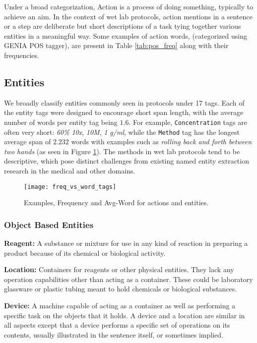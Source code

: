 \documentclass[11pt,a4paper]{article}
\begin{document}
Under a broad categorization, Action is a process of doing something, typically to achieve an aim. In the context of wet lab protocols, action mentions in a sentence or a step are deliberate but short descriptions of a task tying together various entities in a meaningful way.  Some examples of action words, (categorized using GENIA POS tagger), are present in Table \ref{tab:pos_freq} along with their frequencies.

\subsection{Entities}
We broadly classify entities commonly seen in protocols under 17 tags. Each of the entity tags were designed to encourage short span length, with the average number of words per entity tag being $1.6$. For example, \verb!Concentration! tags are often very short: \textit{60\%} \textit{10x}, \textit{10M}, \textit{1 g/ml}, while the \verb!Method! tag has the longest average span of $2.232$ words with examples such as \textit{rolling back and forth between two hands} (as seen in Figure \ref{fig:freq_v_words}). The methods in wet lab protocols tend to be descriptive, which pose distinct challenges from existing named entity extraction research in the medical and other domains. 



\begin{figure}[h]
    \centering
    \texttt{[image: freq\_vs\_word\_tags]}
    \caption{ Examples, Frequency and Avg-Word for actions and entities.}
    \label{fig:freq_v_words}
\end{figure}

\subsubsection{Object Based Entities}

\noindent
\textbf{Reagent:} A substance or mixture for use in any kind of reaction in preparing a product because of its chemical or biological activity.

\noindent
\textbf{Location:} Containers for reagents or other physical entities. They lack any operation capabilities other than acting as a container. These could be laboratory glassware or plastic tubing meant to hold chemicals or biological substances. 

\noindent
\textbf{Device:} A machine capable of acting as a container as well as performing a specific task on the objects that it holds. A device and a location are similar in all aspects except that a device performs a specific set of operations on its contents, usually illustrated in the sentence itself, or sometimes implied. 
\end{document}
